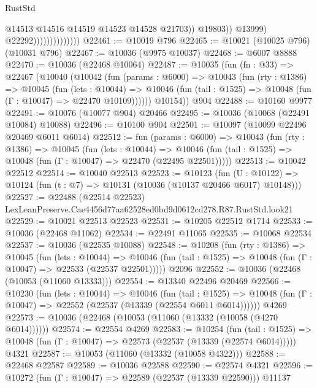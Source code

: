 \begin{lexlean}{RustStd}
\begin{coremodule}
{{                                          @14513
                                          @14516
                                          @14519
                                          @14523
                                          @14528
                                          @21703))
                                      @19803))
                                  @13999)
                                @22292))))))))))))))
@22461 := @10019 @796
@22465 := @10021 (@10025 @796) (@10031 @796)
@22467 := @10036 (@9975 @10037)
@22468 := @6007 @8888
@22470 := @10036 (@22468 @10064)
@22487 := @10035
    (fun (fn : @33) =>
    @22467
      (@10040
        (@10042
          (fun (params : @6000) =>
          @10043
            (fun (rty : @1386) =>
            @10045
              (fun (lets : @10044) =>
              @10046 (fun (tail : @1525) => @10048 (fun (Γ : @10047) => @22470 @10109))))))
        @10154))
    @904
@22488 := @10160 @9977
@22491 := @10076 (@10077 @904) @20466
@22495 := @10036 (@10068 (@22491 @10084) @10088)
@22496 := @10100 @904
@22501 := @10097 (@10099 @22496 @20469 @6011 @6014)
@22512 := fun (params : @6000) =>
  @10043
    (fun (rty : @1386) =>
    @10045
      (fun (lets : @10044) =>
      @10046 (fun (tail : @1525) => @10048 (fun (Γ : @10047) => @22470 (@22495 @22501)))))
@22513 := @10042 @22512
@22514 := @10040 @22513
@22523 := @10123
    (fun (U : @10122) => @10124 (fun (t : @7) => @10131 (@10036 (@10137 @20466 @6017) @10148)))
@22527 := @22488
    (@22514 @22523)
    LexLeanPreserve.Cae4456d77aa62528ed0bd9d0612cd278.R87.RustStd.look21
@22529 := @10021 @22513 @22523
@22531 := @10205 @22512 @1714
@22533 := @10036 (@22468 @11062)
@22534 := @22491 @11065
@22535 := @10068 @22534
@22537 := @10036 (@22535 @10088)
@22548 := @10208
    (fun (rty : @1386) =>
    @10045
      (fun (lets : @10044) =>
      @10046 (fun (tail : @1525) => @10048 (fun (Γ : @10047) => @22533 (@22537 @22501)))))
    @2096
@22552 := @10036 (@22468 (@10053 (@11060 @13333)))
@22554 := @13340 @22496 @20469
@22566 := @10230
    (fun (lets : @10044) =>
    @10046
      (fun (tail : @1525) =>
      @10048 (fun (Γ : @10047) => @22552 (@22537 (@13339 (@22554 @6011 @6014))))))
    @4269
@22573 := @10036 (@22468 (@10053 (@11060 (@13332 (@10058 (@4270 @6014))))))
@22574 := @22554 @4269
@22583 := @10254
    (fun (tail : @1525) => @10048 (fun (Γ : @10047) => @22573 (@22537 (@13339 (@22574 @6014)))))
    @4321
@22587 := @10053 (@11060 (@13332 (@10058 @4322)))
@22588 := @22468 @22587
@22589 := @10036 @22588
@22590 := @22574 @4321
@22596 := @10272 (fun (Γ : @10047) => @22589 (@22537 (@13339 @22590))) @11137
}}
\end{coremodule}
\end{lexlean}
